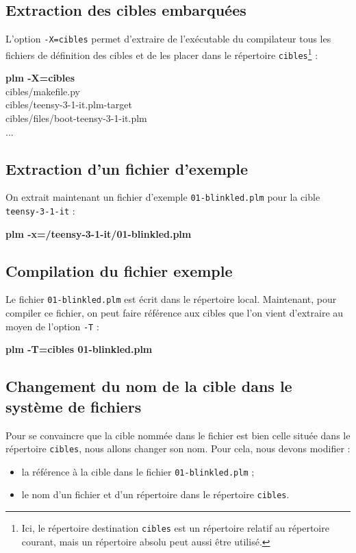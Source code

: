 \subsection{Extraction des cibles embarquées}
L'option \texttt{-X=cibles} permet d'extraire de l'exécutable du compilateur tous les fichiers de définition des cibles et de les placer dans le répertoire \texttt{cibles}\footnote{Ici, le répertoire destination \texttt{cibles} est un répertoire relatif au répertoire courant, mais un répertoire absolu peut aussi être utilisé.} :
\begin{SHELL}
{\bfseries plm -X=cibles}\\
\hspace*{1.2em}cibles/makefile.py\\
\hspace*{1.2em}cibles/teensy-3-1-it.plm-target\\
\hspace*{1.2em}cibles/files/boot-teensy-3-1-it.plm\\
\hspace*{1.2em}...
\end{SHELL}

\subsection{Extraction d'un fichier d'exemple}
On extrait maintenant un fichier d'exemple \texttt{01-blinkled.plm} pour la cible \texttt{teensy-3-1-it} :
\begin{SHELL}
\bfseries plm -x=/teensy-3-1-it/01-blinkled.plm
\end{SHELL}

\subsection{Compilation du fichier exemple}
Le fichier \texttt{01-blinkled.plm} est écrit dans le répertoire local. Maintenant, pour compiler ce fichier, on peut faire référence aux cibles que l'on vient d'extraire au moyen de l'option \texttt{-T} :
\begin{SHELL}
\bfseries plm -T=cibles 01-blinkled.plm
\end{SHELL}


\subsection{Changement du nom de la cible dans le système de fichiers}

Pour se convaincre que la cible nommée dans le fichier est bien celle située dans le répertoire \texttt{cibles}, nous allons changer son nom. Pour cela, nous devons modifier :
\begin{itemize}
  \item la référence à la cible dans le fichier \texttt{01-blinkled.plm} ;
  \item le nom d'un fichier et d'un répertoire dans le répertoire \texttt{cibles}. 
\end{itemize}

